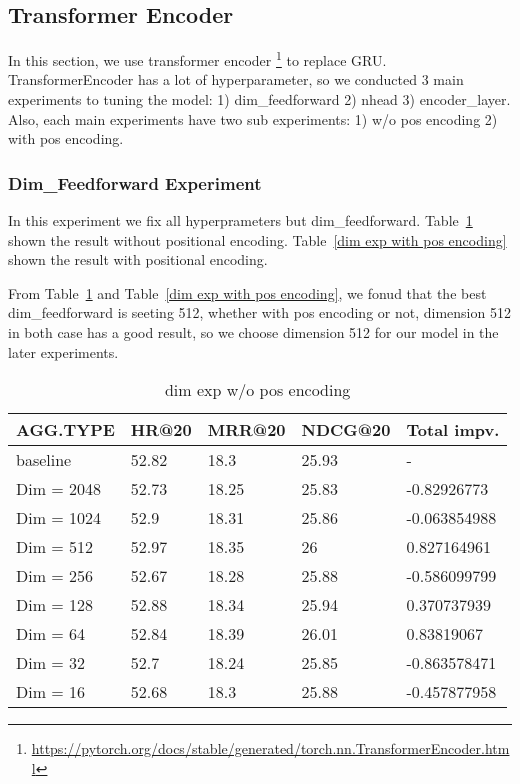 \documentclass{article}
\begin{document}
\subsection{Transformer Encoder}

In this section, we use transformer encoder
\footnote{\url{https://pytorch.org/docs/stable/generated/torch.nn.TransformerEncoder.html}}
to replace GRU.
TransformerEncoder has a lot of hyperparameter, so we conducted
3 main experiments to tuning the model:
1) dim\_feedforward 2) nhead 3) encoder\_layer.
Also, each main experiments have two sub experiments:
1) w/o pos encoding 2) with pos encoding.

\subsubsection{Dim\_Feedforward Experiment}

In this experiment we fix all hyperprameters but dim\_feedforward.
Table~\ref{dim exp w/o pos encoding} shown the result without
positional encoding.
Table~\ref{dim exp with pos encoding} shown the result with positional encoding.

From Table~\ref{dim exp w/o pos encoding} and Table~\ref{dim exp with pos encoding},
we fonud that the best dim\_feedforward is seeting 512,
whether with pos encoding or not, dimension 512 in both case has a good result,
so we choose dimension 512 for our model in the later experiments.

\begin{table}
    \caption{dim exp w/o pos encoding}
    \label{dim exp w/o pos encoding}
    \centering
    \begin{tabular}{lllll}
        \toprule
        AGG.TYPE   & HR@20 & MRR@20 & NDCG@20 & Total impv.  \\
        \midrule
        baseline   & 52.82 & 18.3   & 25.93   & -            \\
        Dim = 2048 & 52.73 & 18.25  & 25.83   & -0.82926773  \\
        Dim = 1024 & 52.9  & 18.31  & 25.86   & -0.063854988 \\
        Dim = 512  & 52.97 & 18.35  & 26      & 0.827164961  \\
        Dim = 256  & 52.67 & 18.28  & 25.88   & -0.586099799 \\
        Dim = 128  & 52.88 & 18.34  & 25.94   & 0.370737939  \\
        Dim = 64   & 52.84 & 18.39  & 26.01   & 0.83819067   \\
        Dim = 32   & 52.7  & 18.24  & 25.85   & -0.863578471 \\
        Dim = 16   & 52.68 & 18.3   & 25.88   & -0.457877958 \\
        \bottomrule
    \end{tabular}
\end{table}
\end{document}
